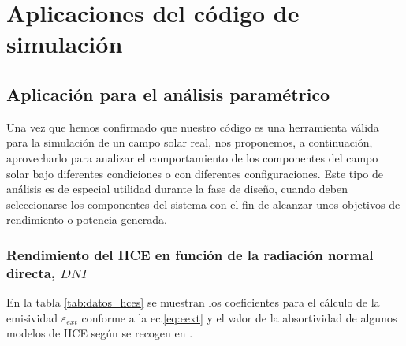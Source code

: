 \chapter{Aplicaciones del código de simulación}
\label{aplicaciones}

\section{Aplicación para el análisis paramétrico}
\label{analisis-parametrico}

Una vez que hemos confirmado que nuestro código es una herramienta válida para la simulación de un campo solar real, nos proponemos, a continuación, aprovecharlo para analizar el comportamiento de los componentes del campo solar bajo diferentes condiciones o con diferentes configuraciones. Este tipo de análisis es de especial utilidad durante la fase de diseño, cuando deben seleccionarse los componentes del sistema con el fin de alcanzar unos objetivos de rendimiento o potencia generada.

\subsection{Rendimiento del HCE en función de la radiación normal directa, $DNI$}

En la tabla \ref{tab:datos_hces} se muestran los coeficientes para el cálculo de la emisividad $\varepsilon_{ext}$ conforme a la ec.\eqref{eq:eext} y el valor de la absortividad de algunos modelos de HCE según se recogen en \cite{barberofresnoDesarrolloModeloTeorico2018}.

\begin{table}[H]
\centering
\caption[Constantes del modelo de emisividad equivalente para cada uno de los receptores seleccionados]{Constantes del modelo de emisividad equivalente para cada uno de los receptores seleccionados. *Al no disponerse de este dato, se ha empleado este valor con el fin de poder incluir el modelo en el test. Fuente \cite{barberofresnoDesarrolloModeloTeorico2018}}
\label{tab:datos_hces}
\end{table}

